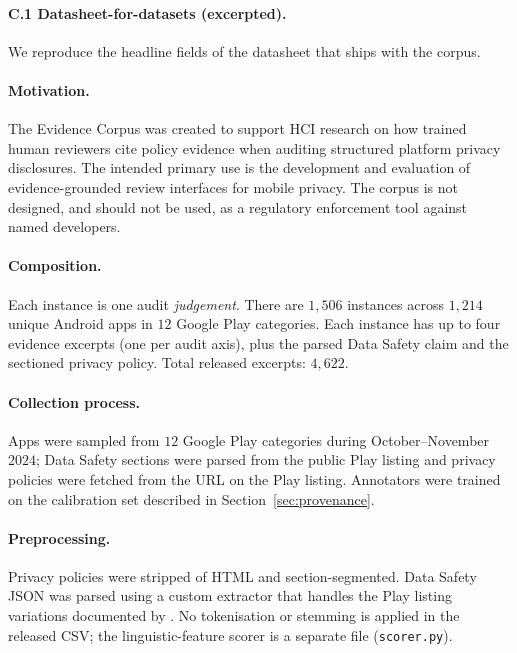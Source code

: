 \documentclass[11pt,a4paper]{article}
\begin{document}
\paragraph{C.1 Datasheet-for-datasets (excerpted).}
We reproduce the headline fields of the datasheet that ships with the
corpus.

\paragraph{Motivation.} The Evidence Corpus was created to support
HCI research on how trained human reviewers cite policy evidence
when auditing structured platform privacy disclosures. The intended
primary use is the development and evaluation of evidence-grounded
review interfaces for mobile privacy. The corpus is not designed,
and should not be used, as a regulatory enforcement tool against
named developers.

\paragraph{Composition.} Each instance is one audit \emph{judgement}.
There are $1{,}506$ instances across $1{,}214$ unique Android apps in
$12$ Google Play categories. Each instance has up to four evidence
excerpts (one per audit axis), plus the parsed Data Safety claim and
the sectioned privacy policy. Total released excerpts: $4{,}622$.

\paragraph{Collection process.} Apps were sampled from $12$ Google
Play categories during October--November $2024$; Data Safety
sections were parsed from the public Play listing and privacy
policies were fetched from the URL on the Play listing. Annotators
were trained on the calibration set described in
Section~\ref{sec:provenance}.

\paragraph{Preprocessing.} Privacy policies were stripped of HTML and
section-segmented. Data Safety JSON was parsed using a custom
extractor that handles the Play listing variations documented by
\citet{khandelwal2024unpacking}. No tokenisation or stemming is
applied in the released CSV; the linguistic-feature scorer is a
separate file (\texttt{scorer.py}).
\end{document}

